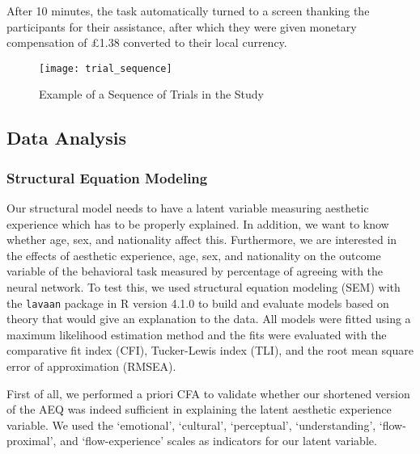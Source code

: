 \documentclass[../main.tex]{subfiles}
\begin{document}
	After 10 minutes, the task automatically turned to a screen thanking the participants for their assistance, after which they were given monetary compensation of £1.38 converted to their local currency.
	
	
	\begin{figure}
		\centering
		\caption{Example of a Sequence of Trials in the Study}
		\label{fig:trial_sequence}
		\texttt{[image: trial\_sequence]}
	\end{figure}

	
	\subsection{Data Analysis}
	\subsubsection{Structural Equation Modeling}
	Our structural model needs to have a latent variable measuring aesthetic experience which has to be properly explained. In addition, we want to know whether age, sex, and nationality affect this. Furthermore, we are interested in the effects of aesthetic experience, age, sex, and nationality on the outcome variable of the behavioral task measured by percentage of agreeing with the neural network. To test this, we used structural equation modeling (SEM) with the \texttt{lavaan} package \parencite{rosseel2012lavaan} in R version 4.1.0 \parencite{rcoreteamlanguage} to build and evaluate models based on theory that would give an explanation to the data. All models were fitted using a maximum likelihood estimation method and the fits were evaluated with the comparative fit index (CFI), Tucker-Lewis index (TLI), and the root mean square error of approximation (RMSEA).
	
	First of all, we performed a priori CFA to validate whether our shortened version of the AEQ was indeed sufficient in explaining the latent aesthetic experience variable. We used the `emotional', `cultural', `perceptual', `understanding', `flow-proximal', and `flow-experience' scales as indicators for our latent variable. 
	
\end{document}
